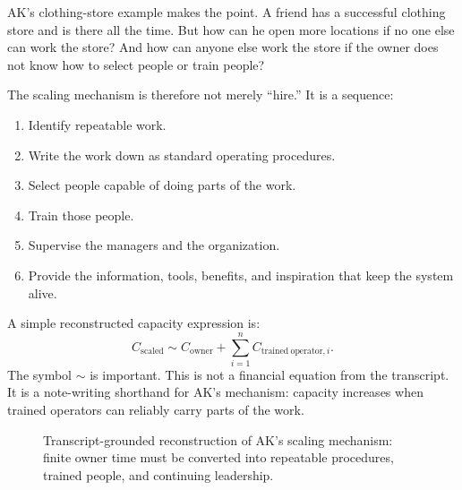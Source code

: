 AK's clothing-store example makes the point. A friend has a successful clothing store and is there all the time. But how can he open more locations if no one else can work the store? And how can anyone else work the store if the owner does not know how to select people or train people?

The scaling mechanism is therefore not merely ``hire.'' It is a sequence:
\begin{enumerate}
\item Identify repeatable work.
\item Write the work down as standard operating procedures.
\item Select people capable of doing parts of the work.
\item Train those people.
\item Supervise the managers and the organization.
\item Provide the information, tools, benefits, and inspiration that keep the system alive.
\end{enumerate}

A simple reconstructed capacity expression is:
\begin{equation}
C_{\mathrm{scaled}}
\sim
C_{\mathrm{owner}}
+
\sum_{i=1}^{n} C_{\mathrm{trained\ operator},i}.
\end{equation}
The symbol \(\sim\) is important. This is not a financial equation from the transcript. It is a note-writing shorthand for AK's mechanism: capacity increases when trained operators can reliably carry parts of the work.

\begin{figure}
\centering
{}
\caption{Transcript-grounded reconstruction of AK's scaling mechanism: finite owner time must be converted into repeatable procedures, trained people, and continuing leadership.}
\end{figure}

